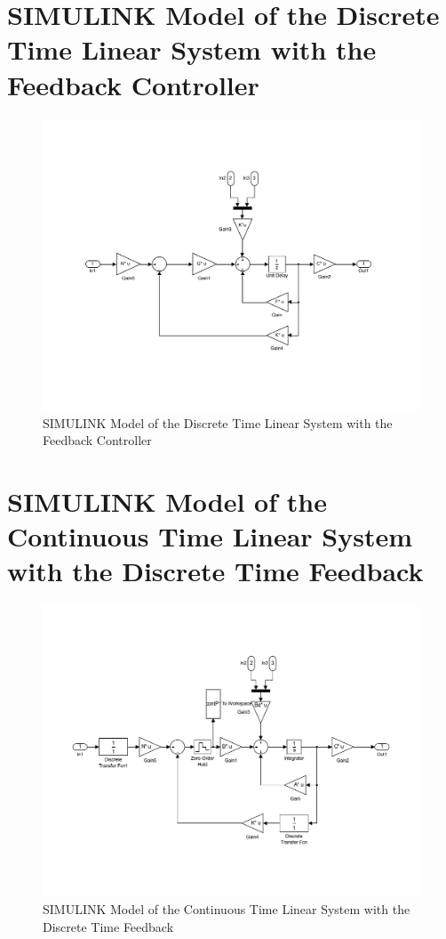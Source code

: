\documentclass[11pt,a4paper,fleqn, onesside]{report}
\begin{document}
\chapter{SIMULINK Model of the Discrete Time Linear System with the Feedback Controller}
\label{AppDiscreteTimeP15}
\begin{figure}[H]
 \centering 
 \includegraphics[trim=3cm 4cm 2cm 3cm, clip=true, totalheight=0.35\textheight, angle=0]{figures/modelP15.pdf}
 \caption{SIMULINK Model of the Discrete Time Linear System with the Feedback Controller}
\label{fig:modelP15}
\end{figure}

\chapter{SIMULINK Model of the Continuous Time Linear System with the Discrete Time Feedback}
\label{AppP16}
\begin{figure}[H]
 \centering 
 \includegraphics[trim=1cm 3cm 2cm 3cm, clip=true, totalheight=0.35\textheight, angle=0]{figures/modelp16.pdf}
 \caption{SIMULINK Model of the Continuous Time Linear System with the Discrete Time Feedback}
\label{fig:modelp16}
\end{figure}
\end{document}

